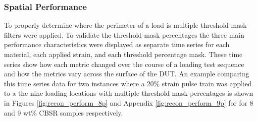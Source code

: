 \subsubsection{Spatial Performance}\label{sec:Spatial Performance2}
To properly determine where the perimeter of a load is multiple threshold mask filters were applied. To validate the threshold mask percentages
 the three main performance characteristics were displayed as separate time series for each material, each applied strain, and each threshold percentage mask. These time series show how each metric changed over the course of a loading test sequence and how the metrics vary across the surface of the DUT. An example comparing this time series data for two instances where a 20\% strain pulse train was applied to a the nine loading locations with multiple threshold mask percentages is shown in Figures \ref{fig:recon_perform_8p} and Appendix \ref{fig:recon_perform_9p} for for 8 and 9 wt\% CBSR samples respectively.
    
